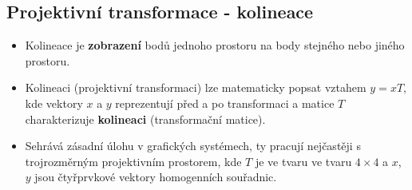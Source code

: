 \subsection{Projektivní transformace - kolineace}
\begin{itemize}
	\item Kolineace je \textbf{zobrazení} bodů jednoho prostoru na body stejného nebo jiného prostoru.
	\item Kolineaci (projektivní transformaci) lze matematicky popsat vztahem $y = xT$, kde vektory $x$ a $y$ reprezentují před a po transformaci a matice $T$ charakterizuje \textbf{kolineaci} (transformační matice).
	\item Sehrává zásadní úlohu v grafických systémech, ty pracují nejčastěji s trojrozměrným projektivním prostorem, kde $T$ je ve tvaru  ve tvaru $4\times4$ a $x$, $y$ jsou čtyřprvkové vektory homogenních souřadnic.
\end{itemize}

